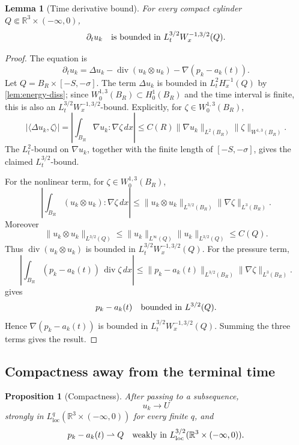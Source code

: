 \documentclass[11pt]{amsart}
\theoremstyle{plain}
\newtheorem{proposition}[theorem]{Proposition}
\newtheorem{lemma}[theorem]{Lemma}
\theoremstyle{definition}
\theoremstyle{remark}
\numberwithin{equation}{section}
\newcommand{\R}{\mathbb R}
\newcommand{\loc}{\mathrm{loc}}
\newcommand{\divergence}{\operatorname{div}}
\begin{document}
\begin{lemma}[Time derivative bound]\label{lem:time-derivative}
For every compact cylinder \(Q\Subset\R^3\times(-\infty,0)\),
\[
   \partial_tu_k
   \quad\hbox{is bounded in }L^{3/2}_tW^{-1,3/2}_x(Q).
\]
\end{lemma}

\begin{proof}
The equation is
\[
   \partial_tu_k
   =
   \Delta u_k-\divergence(u_k\otimes u_k)-\nabla(p_k-a_k(t)).
\]
Let \(Q=B_R\times[-S,-\sigma]\).  The term \(\Delta u_k\) is bounded in
\(L^2_tH^{-1}_x(Q)\) by \cref{lem:energy-diss}; since
\(W^{1,3}_0(B_R)\subset H^1_0(B_R)\) and the time interval is finite, this is
also an \(L^{3/2}_tW^{-1,3/2}_x\)-bound.  Explicitly, for
\(\zeta\in W^{1,3}_0(B_R)\),
\[
   |\langle\Delta u_k,\zeta\rangle|
   =
   \left|\int_{B_R}\nabla u_k:\nabla\zeta\,dx\right|
   \le
   C(R)\|\nabla u_k\|_{L^2(B_R)}\|\zeta\|_{W^{1,3}(B_R)}.
\]
The \(L^2_t\)-bound on \(\nabla u_k\), together with the finite length of
\([-S,-\sigma]\), gives the claimed \(L^{3/2}_t\)-bound.

For the nonlinear term, for
\(\zeta\in W^{1,3}_0(B_R)\),
\[
   \left|\int_{B_R}(u_k\otimes u_k):\nabla\zeta\,dx\right|
   \le
   \|u_k\otimes u_k\|_{L^{3/2}(B_R)}
   \|\nabla\zeta\|_{L^3(B_R)}.
\]
Moreover
\[
   \|u_k\otimes u_k\|_{L^{3/2}(Q)}
   \le
   \|u_k\|_{L^\infty(Q)}\|u_k\|_{L^{3/2}(Q)}
   \le C(Q).
\]
Thus \(\divergence(u_k\otimes u_k)\) is bounded in
\(L^{3/2}_tW^{-1,3/2}_x(Q)\).
For the pressure term,
\[
   \left|\int_{B_R}(p_k-a_k(t))\,\divergence\zeta\,dx\right|
   \le
   \|p_k-a_k(t)\|_{L^{3/2}(B_R)}
   \|\nabla\zeta\|_{L^3(B_R)}.
\]
 gives
\[
   p_k-a_k(t)\quad\hbox{bounded in }L^{3/2}(Q).
\]
Hence \(\nabla(p_k-a_k(t))\) is bounded in
\(L^{3/2}_tW^{-1,3/2}_x(Q)\).  Summing the three terms gives the result.
\end{proof}

\subsection{Compactness away from the terminal time}

\begin{proposition}[Compactness]\label{prop:compactness}
After passing to a subsequence,
\[
   u_k\to U
\]
strongly in \(L^q_{\loc}(\R^3\times(-\infty,0))\) for every finite \(q\), and
\[
   p_k-a_k(t)\rightharpoonup Q
   \quad\hbox{weakly in }L^{3/2}_{\loc}(\R^3\times(-\infty,0)).
\]
\end{proposition}
\end{document}
